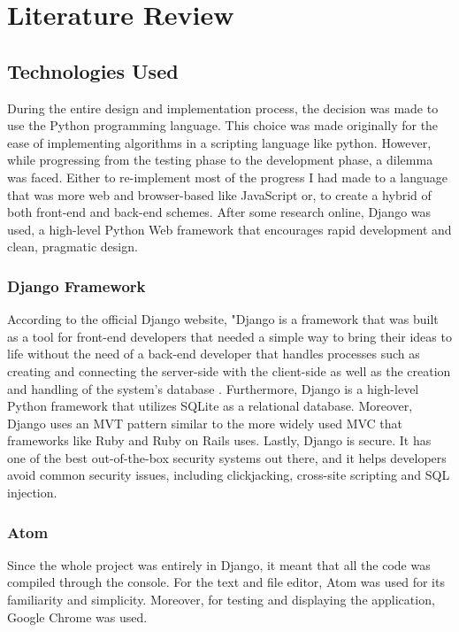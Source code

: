 
\chapter{Literature Review}

\section {Technologies Used}
During the entire design and implementation process, the decision was made to use the Python programming language. This choice was made originally for the ease of implementing algorithms in a scripting language like python. However, while progressing from the testing phase to the development phase, a dilemma was faced. Either to re-implement most of the progress I had made to a language that was more web and browser-based like JavaScript or, to create a hybrid of both front-end and back-end schemes. After some research online, Django was used, a high-level Python Web framework that encourages rapid development and clean, pragmatic design.

\subsection{Django Framework}
According to the official Django website, "Django is a framework that was built as a tool for front-end developers that needed a simple way to bring their ideas to life without the need of a back-end developer that handles processes such as creating and connecting the server-side with the client-side as well as the creation and handling of the system's database \cite{djangostars_2016_why}. Furthermore, Django is a high-level Python framework that utilizes SQLite as a relational database. Moreover, Django uses an MVT pattern similar to the more widely used MVC that frameworks like Ruby and Ruby on Rails uses. Lastly, Django is secure. It has one of the best out-of-the-box security systems out there, and it helps developers avoid common security issues, including clickjacking, cross-site scripting and SQL injection.

\subsection {Atom}
Since the whole project was entirely in Django, it meant that all the code was compiled through the console. For the text and file editor, Atom was used for its familiarity and simplicity. Moreover, for testing and displaying the application, Google Chrome was used.


